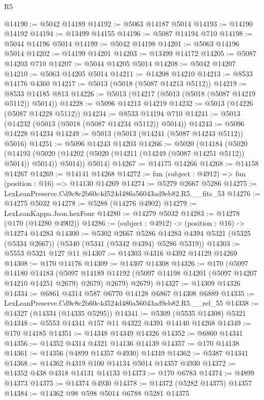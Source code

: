 \begin{lexlean}{R5}
\begin{coremodule}
@14190 := @5042 @14189
@14192 := @5063 @14187 @5014
@14193 := @14190 @14192
@14194 := @13499 @14155
@14196 := @5087 @14194 @710
@14198 := @5044 @14196 @5014
@14199 := @5042 @14198
@14201 := @5063 @14196 @5014
@14202 := @14199 @14201
@14203 := @13499 @14172
@14205 := @5087 @14203 @710
@14207 := @5044 @14205 @5014
@14208 := @5042 @14207
@14210 := @5063 @14205 @5014
@14211 := @14208 @14210
@14213 := @8533 @14176 @4360
@14217 := @5013 (@5018 (@5087 @14213 @5112))
@14219 := @8533 @14185 @813
@14226 := @5013 (@14217 (@5013 (@5018 (@5087 @14219 @5112)) @5014))
@14228 := @5096 @14213 @14219
@14232 := @5013 (@14226 (@5087 @14228 @5112))
@14234 := @8533 @14194 @710
@14241 := @5013 (@14232 (@5013 (@5018 (@5087 @14234 @5112)) @5014))
@14243 := @5096 @14228 @14234
@14249 := @5013 (@5013 (@14241 (@5087 @14243 @5112)) @5016)
@14251 := @5096 @14243 @14203
@14266 := @5020
    (@14184
      (@5020
        (@14193 (@5020 (@14202 (@5020 (@14211 (@14249 (@5087 @14251 @5112)) @5014)) @5014)) @5014))
      @5014)
@14267 := @14175 @14266
@14268 := @14158 @14267
@14269 := @14141 @14268
@14272 := fun (subject : @4912) => fun (position : @16) => @14130 @14269
@14274 := @5279 @2667 @5286
@14275 := LexLeanPreserve.Cd9c8c2b60c4d524d486a56043ad9eb82.R5.__fits_53
@14276 := @14275 @5032
@14278 := @5288 (@14276 @4902)
@14279 := LexLeanKappa.Json.hexFour
@14280 := @14279 @5032
@14283 := @14278 (@170 (@14280 @4902))
@14286 := (subject : @4912) -> (position : @16) -> @14274 @14283
@14300 := @5302
    @2667
    @5286
    @14283
    @4394
    @5321
    (@5325 (@5334 @2667))
    (@5340 (@5341 (@5342 @4394) @5286 @5319))
@14303 := @5553 @5321 @127 @11
@14307 := @14303 @4316 @4392 @14129 @14269
@14308 := @170 @14176
@14309 := @14307 @14308
@14326 := @170
    (@5097
      @14180
      @14183
      (@5097 @14189 @14192 (@5097 @14198 @14201 (@5097 @14207 @14210 @14251 @2679) @2679) @2679)
      @2679)
@14327 := @14309 @14326
@14334 := @6861 @4314 @587 @6770 @14128 @6867 @14308 @6889
@14335 := LexLeanPreserve.Cd9c8c2b60c4d524d486a56043ad9eb82.R5.__rel_55
@14338 := @14327 (@14334 (@14335 @5295))
@14341 := @5309 (@5535 @14308) @5321
@14348 := @5553 @14341 @157 @11 @4322 @4391 @14140 @14268
@14349 := @170 @14185
@14351 := @14348 @14349 @14326
@14352 := @6860 @14341
@14356 := @14352 @4314 @4321 @14136 @14139
@14357 := @170 @14138
@14361 := @14356 (@4899 @14357 @4930) @14349
@14362 := @5387 @14341
@14368 := @14362 @4319 @100 @14134 @5014 @14357 @4930
@14372 := @14352 @438 @4318 @14131 @14133
@14373 := @170 @6783
@14374 := @4899 @14373
@14375 := @14374 @4930
@14378 := @14372 (@5282 @14375) @14357
@14384 := @14362 @98 @598 @5014 @6788 @5281 @14375

\end{coremodule}
\end{lexlean}
